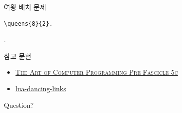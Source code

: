 \documentclass[xcolor=svgnames]{beamer}
\begin{document}
%
\begin{frame}[fragile]{여왕 배치 문제}
\begin{verbatim}
\queens{8}{2}.
\end{verbatim}
\vspace{-10mm}
.
\end{frame}


%
\begin{frame}{참고 문헌}
  \begin{itemize}
  \item \href{http://www-cs-faculty.stanford.edu/~knuth/fasc5c.ps.gz}
    {\textsc{The Art of Computer Programming Pre-Fascicle 5c}}
  \item \href{https://github.com/sjnam/lua-dancing-links}
    {lua-dancing-links}
  \end{itemize}
\end{frame}

%
\begin{frame}[standout]
  Question?
\end{frame}
\end{document}
